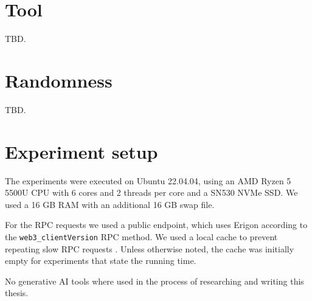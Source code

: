 \documentclass[draft,final]{vutinfth} %
\begin{document}
\section{Tool}

TBD.

\section{Randomness}

TBD.

\section{Experiment setup}

The experiments were executed on Ubuntu 22.04.04, using an AMD Ryzen 5 5500U CPU with 6 cores and 2 threads per core and a SN530 NVMe SSD. We used a 16 GB RAM with an additional 16 GB swap file.

For the RPC requests we used a public endpoint\cite{noauthor_pokt_2024}, which uses Erigon\cite{noauthor_rpc_2024} according to the \verb|web3_clientVersion| RPC method. We used a local cache to prevent repeating slow RPC requests \cite{noauthor_fuzzlandcached-eth-rpc_2024}. Unless otherwise noted, the cache was initially empty for experiments that state the running time.

\backmatter

\begin{aitools}
    No generative AI tools where used in the process of researching and writing this thesis.
\end{aitools}

\listoffigures %

\cleardoublepage %
\listoftables %

\listofalgorithms
{}

\printindex

\printglossaries



\end{document}
